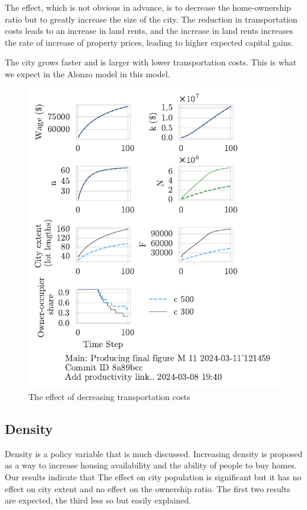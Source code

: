 The effect, which is not obvious in advance, is to decrease the home-ownership ratio but to greatly increase the size of the city. The reduction in transportation costs leads to an increase in land rents, and the increase in land rents increases the rate of increase of property prices, leading to higher expected capital gains.

The city grows faster and is larger with lower transportation costs. This is what we expect in the Alonzo model in this model.


\begin{figure}[h!t]
    \centering
    \includegraphics[scale=.8, trim={0 1.4cm 0 0},clip]{fig/c-Main-121459.pdf}
    \caption{The effect of decreasing transportation costs}
    \label{fig:c_ownership_trajectory}
\end{figure}


\newpage
\subsection{Density}
Density is a policy variable that is much discussed. Increasing density is proposed as a way to increase housing availability and the ability of people to buy homes. Our results indicate that The effect on city population is significant but it has no effect on city extent and no effect on the ownership ratio. The first two results are expected, the third less so but easily explained. 

